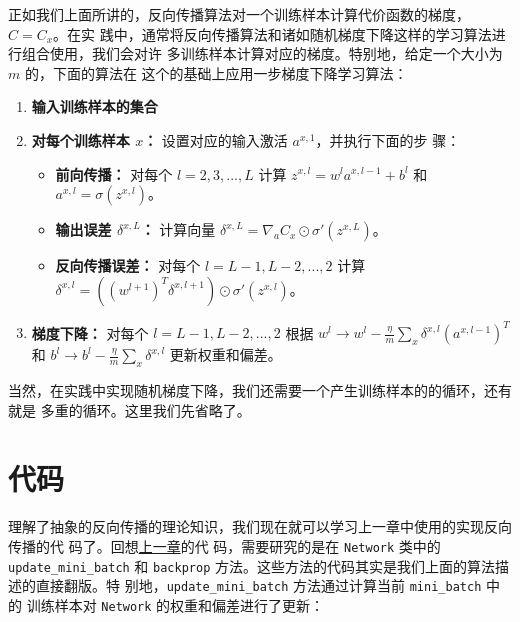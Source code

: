 正如我们上面所讲的，反向传播算法对一个训练样本计算代价函数的梯度，$C=C_x$。在实
践中，通常将反向传播算法和诸如随机梯度下降这样的学习算法进行组合使用，我们会对许
多训练样本计算对应的梯度。特别地，给定一个大小为 $m$ 的\minibatch{}，下面的算法在
这个\minibatch{}的基础上应用一步梯度下降学习算法：

\begin{enumerate}
\item \textbf{输入训练样本的集合}
\item \textbf{对每个训练样本 $x$：} 设置对应的输入激活 $a^{x,1}$，并执行下面的步
  骤：
  \begin{itemize}
  \item \textbf{前向传播：} 对每个 $l=2,3,...,L$ 计算 $z^{x,l} = w^la^{x,l-1} +
    b^l$ 和 $a^{x,l} = \sigma(z^{x,l})$。
  \item \textbf{输出误差 $\delta^{x,L}$：} 计算向量
    $\delta^{x,L} = \nabla_a C_x \odot \sigma'(z^{x,L})$。
  \item \textbf{反向传播误差：} 对每个 $l=L-1, L-2, ..., 2$ 计算
    $\delta^{x,l} = ((w^{l+1})^T\delta^{x,l+1})\odot \sigma'(z^{x,l})$。
  \end{itemize}
\item \textbf{梯度下降：} 对每个 $l=L-1, L-2, ..., 2$ 根据
  $w^l \rightarrow w^l - \frac{\eta}{m}\sum_x \delta^{x,l}(a^{x,l-1})^T$ 和
  $b^l \rightarrow b^l - \frac{\eta}{m}\sum_x \delta^{x,l}$ 更新权重和偏差。
\end{enumerate}

当然，在实践中实现随机梯度下降，我们还需要一个产生训练样本的\minibatch{}的循环，还有就是
多重\epochs{}的循环。这里我们先省略了。

\section{代码}
\label{sec:the_code_for_backpropagation}

理解了抽象的反向传播的理论知识，我们现在就可以学习上一章中使用的实现反向传播的代
码了。回想\hyperref[sec:implementing_our_network_to_classify_digits]{上一章}的代
码，需要研究的是在 \lstinline!Network! 类中的 \lstinline!update_mini_batch! 和
\lstinline!backprop! 方法。这些方法的代码其实是我们上面的算法描述的直接翻版。特
别地，\lstinline!update_mini_batch! 方法通过计算当前 \lstinline!mini_batch! 中的
训练样本对 \lstinline!Network! 的权重和偏差进行了更新：

